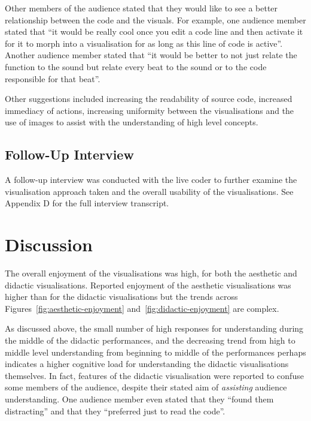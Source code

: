 Other members of the audience stated that they would like to see a better relationship between the code and the visuals. For example, one audience member stated that ``it would be really cool once you edit a code line and then activate it for it to morph into a visualisation for as long as this line of code is active''. Another audience member stated that ``it would be better to not just relate the function to the sound but relate every beat to the sound or to the code responsible for that beat''.

Other suggestions included increasing the readability of source code, increased immediacy of actions, increasing uniformity between the visualisations and the use of images to assist with the understanding of high level concepts.

\subsection{Follow-Up Interview}

A follow-up interview was conducted with the live coder to further examine the visualisation approach taken and the overall usability of the visualisations. See Appendix D for the full interview transcript.

\section{Discussion}

The overall enjoyment of the visualisations was high, for both the aesthetic and didactic visualisations. Reported enjoyment of the aesthetic visualisations was higher than for the didactic visualisations but the trends across Figures~\ref{fig:aesthetic-enjoyment} and~\ref{fig:didactic-enjoyment} are complex.
 
As discussed above, the small number of high responses for understanding during the middle of the didactic performances, and the decreasing trend from high to middle level understanding from beginning to middle of the performances perhaps indicates a higher cognitive load for understanding the didactic visualisations themselves. In fact, features of the didactic visualisation were reported to confuse some members of the audience, despite their stated aim of \emph{assisting} audience understanding. One audience member even stated that they ``found them distracting'' and that they ``preferred just to read the code''.
 
